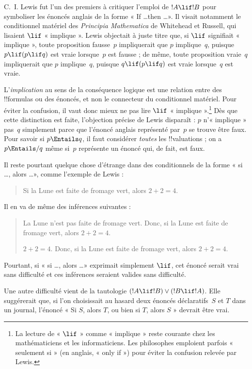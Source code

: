 \documentclass[../../../include/open-logic-section]{subfiles}
\begin{document}


C.~I. Lewis fut l'un des premiers à critiquer l'emploi de
$!A \lif !B$ pour symboliser les énoncés anglais de la forme
« If \dots then \dots ». Il visait notamment le conditionnel
matériel des \emph{Principia Mathematica} de Whitehead et Russell,
qui lisaient $\lif$ « implique ». Lewis objectait à juste titre
que, si $\lif$ signifiait « implique », toute proposition
fausse~$p$ impliquerait que $p$ implique~$q$, puisque
$p \lif (p \lif q)$ est vraie lorsque~$p$ est fausse ; de même,
toute proposition vraie~$q$ impliquerait que $p$ implique~$q$,
puisque $q \lif (p \lif q)$ est vraie lorsque~$q$ est vraie.

L'\emph{implication} au sens de la conséquence logique est une
relation entre des !!{formula}s ou des énoncés, et non le
connecteur du conditionnel matériel. Pour éviter la confusion, il
vaut donc mieux ne pas lire $\lif$ « implique ».\footnote{La
  lecture de « $\lif$ »
  comme « implique » reste courante chez les mathématiciens et les
  informaticiens. Les philosophes emploient parfois « seulement si »
  (en anglais, « only if ») pour éviter la confusion relevée par
  Lewis.} Dès que cette distinction est faite, l'objection précise
de Lewis disparaît : $p$ n'« implique » pas~$q$ simplement parce
que l'énoncé anglais représenté par~$p$ se trouve être faux. Pour
savoir si $p \Entails q$, il faut considérer \emph{toutes} les
!!{valuation}s ; on a $p \Entails/ q$ même si~$p$ représente un
énoncé qui, de fait, est faux.

Il reste pourtant quelque chose d'étrange dans des conditionnels de
la forme « si \dots, alors \dots », comme l'exemple de Lewis :
\begin{quote}
Si la Lune est faite de fromage vert, alors $2+2=4$.
\end{quote}
Il en va de même des inférences suivantes :
\begin{quote}
  La Lune n'est pas faite de fromage vert. Donc, si la Lune est faite
  de fromage vert, alors $2+2=4$.

  $2+2 = 4$. Donc, si la Lune est faite de fromage vert, alors
  $2+2=4$.
\end{quote}
Pourtant, si « si \dots, alors \dots » exprimait simplement
$\lif$, cet énoncé serait vrai sans difficulté et ces inférences
seraient valides sans difficulté.

Une autre difficulté vient de la tautologie $(!A \lif !B) \lor
(!B \lif !A)$. Elle suggérerait que, si l'on choisissait au hasard
deux énoncés déclaratifs~$S$ et $T$ dans un journal, l'énoncé
« Si $S$, alors $T$, ou bien si $T$, alors $S$ » devrait être vrai.
\end{document}
